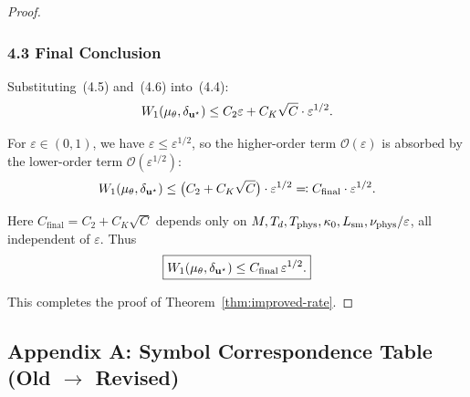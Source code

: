 \begin{proof}
\subsubsection{4.3 Final Conclusion}

Substituting~(4.5) and~(4.6) into~(4.4):
\begin{equation}
  W_{1}(\mu_{\theta}, \delta_{\mathbf{u}^{\star}}) \leq C_2 \varepsilon + C_K \sqrt{C} \cdot \varepsilon^{1/2}.
\end{equation}

For $\varepsilon \in (0,1)$, we have $\varepsilon \leq \varepsilon^{1/2}$, so the higher-order term $\mathcal{O}(\varepsilon)$ is absorbed by the lower-order term $\mathcal{O}(\varepsilon^{1/2})$:
\begin{equation}
  W_{1}(\mu_{\theta}, \delta_{\mathbf{u}^{\star}}) \leq \bigl(C_2 + C_K \sqrt{C}\bigr) \cdot \varepsilon^{1/2} \eqqcolon C_{\mathrm{final}} \cdot \varepsilon^{1/2}.
\end{equation}

Here $C_{\mathrm{final}} = C_2 + C_K \sqrt{C}$ depends only on $M, T_d, T_{\mathrm{phys}}, \kappa_0, L_{\mathrm{sm}}, \nu_{\mathrm{phys}}/\varepsilon$, all independent of $\varepsilon$. Thus
\begin{equation}
  \boxed{\displaystyle W_{1}(\mu_{\theta}, \delta_{\mathbf{u}^{\star}}) \leq C_{\mathrm{final}} \, \varepsilon^{1/2}.}
\end{equation}

This completes the proof of Theorem~\ref{thm:improved-rate}.
\end{proof}

\subsection*{Appendix A: Symbol Correspondence Table (Old \texorpdfstring{$\to$}{to} Revised)}

